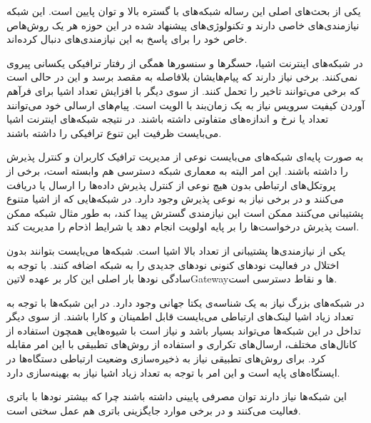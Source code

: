 
یکی از بحث‌های اصلی این رساله شبکه‌های با گستره بالا و توان پایین است. این شبکه نیازمندی‌های خاصی دارند و تکنولوژی‌های پیشنهاد شده در این حوزه
هر یک روش‌هاص خاص خود را برای پاسخ به این نیازمندی‌های دنبال کرده‌اند.


در شبکه‌های اینترنت اشیا، حسگرها و سنسورها همگی از رفتار ترافیکی یکسانی پیروی نمی‌کنند. برخی نیاز دارند که پیام‌هایشان بلافاصله به مقصد برسد و این در حالی است که برخی می‌توانند تاخیر را تحمل کنند.
از سوی دیگر با افزایش تعداد اشیا برای فرآهم آوردن کیفیت سرویس نیاز به یک زمان‌بند با الویت است. پیام‌های ارسالی خود می‌توانند تعداد یا نرخ و اندازه‌های متفاوتی داشته باشند.
در نتیجه شبکه‌های اینترنت اشیا می‌بایست ظرفیت این تنوع ترافیکی را داشته باشند.

به صورت پایه‌ای شبکه‌های می‌بایست نوعی از مدیریت ترافیک کاربران و کنترل پذیرش را داشته باشند.
این امر البته به معماری شبکه دسترسی هم وابسته است، برخی از پروتکل‌های ارتباطی بدون هیچ نوعی از کنترل پذیرش
داده‌ها را ارسال یا دریافت می‌کنند و در برخی نیاز به نوعی پذیرش وجود دارد.
در شبکه‌هایی که از اشیا متنوع پشتیبانی می‌کنند ممکن است این نیازمندی گسترش پیدا کند، به طور مثال
شبکه ممکن است پذیرش درخواست‌ها را بر پایه اولویت انجام دهد یا شرایط اذحام را مدیریت کند.


یکی از نیازمندی‌ها پشتیبانی از تعداد بالا اشیا است. شبکه‌ها می‌بایست بتوانند بدون اختلال در فعالیت نودهای کنونی نودهای جدیدی را به شبکه اضافه کنند.
با توجه به سادگی نودها بار اصلی این کار بر عهده ‌لاتین{Gateway}ها و نقاط دسترسی است.

در شبکه‌های بزرگ نیاز به یک شناسه‌ی یکتا جهانی وجود دارد.
در این شبکه‌ها با توجه به تعداد زیاد اشیا لینک‌های ارتباطی می‌بایست قابل اطمینان و کارا باشند.
از سوی دیگر تداخل در این شبکه‌ها می‌تواند بسیار باشد و نیاز است با شیوه‌هایی همچون استفاده از کانال‌های مختلف،
ارسال‌های تکراری و استفاده از روش‌های تطبیقی با این امر مقابله کرد.
برای روش‌های تطبیقی نیاز به ذخیره‌سازی وضعیت ارتباطی دستگاه‌ها در ایستگاه‌های پایه است و این امر با توجه به تعداد زیاد
اشیا نیاز به بهینه‌سازی دارد.


این شبکه‌ها نیاز دارند توان مصرفی پایینی داشته باشند چرا که بیشتر نودها با باتری فعالیت می‌کنند
و در برخی موارد جایگزینی باتری هم عمل سختی است.

